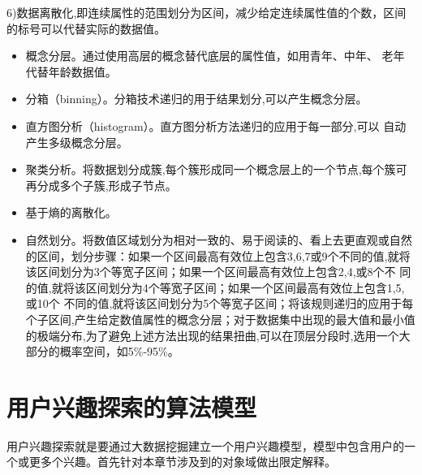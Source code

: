   6)数据离散化,即连续属性的范围划分为区间，减少给定连续属性值的个数，区间的标号可以代替实际的数据值。
  \begin{itemize}
  \item 概念分层。通过使用高层的概念替代底层的属性值，如用青年、中年、 老年代替年龄数据值。
  \item 分箱（binning）。分箱技术递归的用于结果划分,可以产生概念分层。
  \item 直方图分析（histogram）。直方图分析方法递归的应用于每一部分,可以 自动产生多级概念分层。
  \item 聚类分析。将数据划分成簇,每个簇形成同一个概念层上的一个节点,每个簇可再分成多个子簇,形成子节点。
  \item 基于熵的离散化。
  \item 自然划分。将数值区域划分为相对一致的、易于阅读的、看上去更直观或自然的区间，划分步骤：如果一个区间最高有效位上包含3,6,7或9个不同的值,就将该区间划分为3个等宽子区间；如果一个区间最高有效位上包含2,4,或8个不 同的值,就将该区间划分为4个等宽子区间；如果一个区间最高有效位上包含1,5,或10个 不同的值,就将该区间划分为5个等宽子区间；将该规则递归的应用于每个子区间,产生给定数值属性的概念分层；对于数据集中出现的最大值和最小值的极端分布,为了避免上述方法出现的结果扭曲,可以在顶层分段时,选用一个大部分的概率空间，如5\%-95\%。
  \end{itemize}

\section{用户兴趣探索的算法模型}
用户兴趣探索就是要通过大数据挖掘建立一个用户兴趣模型，模型中包含用户的一个或更多个兴趣。首先针对本章节涉及到的对象域做出限定解释。

